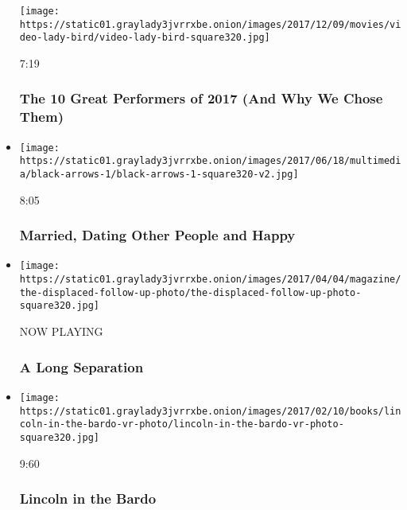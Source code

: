 \begin{itemize}
  \texttt{[image: https://static01.graylady3jvrrxbe.onion/images/2017/12/09/movies/video-lady-bird/video-lady-bird-square320.jpg]}

  7:19

  \hypertarget{the-10-great-performers-of-2017-and-why-we-chose-them}{%
  \subsubsection{The 10 Great Performers of 2017 (And Why We Chose
  Them)}\label{the-10-great-performers-of-2017-and-why-we-chose-them}}
\item
  \href{https://www.nytimes3xbfgragh.onion/video/magazine/100000005087630/open-marriages-non-monogamy.html?action=click\&module=video-series-bar\&region=header\&pgtype=Article\&playlistId=video/magazine}{}

  \texttt{[image: https://static01.graylady3jvrrxbe.onion/images/2017/06/18/multimedia/black-arrows-1/black-arrows-1-square320-v2.jpg]}

  8:05

  \hypertarget{married-dating-other-people-and-happy}{%
  \subsubsection{Married, Dating Other People and
  Happy}\label{married-dating-other-people-and-happy}}
\item
  \texttt{[image: https://static01.graylady3jvrrxbe.onion/images/2017/04/04/magazine/the-displaced-follow-up-photo/the-displaced-follow-up-photo-square320.jpg]}

  NOW PLAYING

  \hypertarget{a-long-separation-1}{%
  \subsubsection{A Long Separation}\label{a-long-separation-1}}
\item
  \href{https://www.nytimes3xbfgragh.onion/video/magazine/100000004919906/lincoln-in-the-bardo.html?action=click\&module=video-series-bar\&region=header\&pgtype=Article\&playlistId=video/magazine}{}

  \texttt{[image: https://static01.graylady3jvrrxbe.onion/images/2017/02/10/books/lincoln-in-the-bardo-vr-photo/lincoln-in-the-bardo-vr-photo-square320.jpg]}

  9:60

  \hypertarget{lincoln-in-the-bardo}{%
  \subsubsection{Lincoln in the Bardo}\label{lincoln-in-the-bardo}}
\end{itemize}

